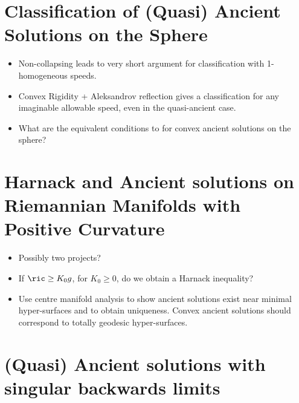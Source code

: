 \documentclass{amsart}
\begin{document}
\section{Classification of (Quasi) Ancient Solutions on the Sphere}

\begin{itemize}
\item Non-collapsing leads to very short argument for classification with 1-homogeneous speeds.
\item Convex Rigidity + Aleksandrov reflection gives a classification for any imaginable allowable speed, even in the quasi-ancient case.
\item What are the equivalent conditions to \cite{2014arXiv1405.7509H} for convex ancient solutions on the sphere?
\end{itemize}

\section{Harnack and Ancient solutions on Riemannian Manifolds with Positive Curvature}

\begin{itemize}
\item Possibly two projects?
\item If $\ric \geq K_0 g$, for $K_0 \geq 0$, do we obtain a Harnack inequality?
\item Use centre manifold analysis to show ancient solutions exist near minimal hyper-surfaces and to obtain uniqueness. Convex ancient solutions should correspond to totally geodesic hyper-surfaces.
\end{itemize}

\section{(Quasi) Ancient solutions with singular backwards limits}
\end{document}
